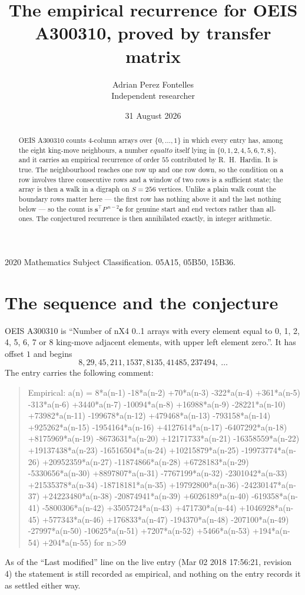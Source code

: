 \documentclass[11pt,a4paper]{article}
\title{The empirical recurrence for OEIS A300310, proved by transfer matrix}
\author{Adrian Perez Fontelles\\ \small Independent researcher}
\date{31 August 2026}
\theoremstyle{plain}
\theoremstyle{definition}
\begin{document}
\maketitle

\begin{abstract}
OEIS A300310 counts $4$-column arrays over $\{0,\dots,1\}$ in which every entry has,
among the eight king-move neighbours, a number $equal to$ itself lying in $\{0,1,2,4,5,6,7,8\}$, and it carries an empirical
recurrence of order $55$ contributed by R.~H.~Hardin. It is true. The neighbourhood
reaches one row up and one row down, so the condition on a row involves three consecutive
rows and a window of two rows is a sufficient state; the array is then a walk in a digraph
on $S=256$ vertices. Unlike a plain walk count the boundary rows matter here --- the first
row has nothing above it and the last nothing below --- so the count is
$\mathbf{s}^{\!\top}P^{\,n-2}\mathbf{e}$ for genuine start and end vectors rather than
all-ones. The conjectured recurrence is then annihilated exactly, in integer arithmetic.
\end{abstract}

\noindent\small 2020 Mathematics Subject Classification. 05A15, 05B50, 15B36.\normalsize

\section{The sequence and the conjecture}

OEIS A300310 is ``Number of nX4 0..1 arrays with every element equal to 0, 1, 2, 4, 5, 6, 7 or 8 king-move adjacent elements, with upper left element zero.''. It has offset
$1$ and begins
\[
8, 29, 45, 211, 1537, 8135, 41485, 237494,\ \dots
\]
The entry carries the following comment:
\begin{quote}\small
Empirical: a(n) = 8*a(n-1) -18*a(n-2) +70*a(n-3) -322*a(n-4) +361*a(n-5) -313*a(n-6) +3440*a(n-7) -10094*a(n-8) +16988*a(n-9) -28221*a(n-10) +73982*a(n-11) -199678*a(n-12) +479468*a(n-13) -793158*a(n-14) +925262*a(n-15) -1954164*a(n-16) +4127614*a(n-17) -6407292*a(n-18) +8175969*a(n-19) -8673631*a(n-20) +12171733*a(n-21) -16358559*a(n-22) +19137438*a(n-23) -16516504*a(n-24) +10215879*a(n-25) -19973774*a(n-26) +20952359*a(n-27) -11874866*a(n-28) +6728183*a(n-29) -5330656*a(n-30) +8897807*a(n-31) -7767199*a(n-32) -2301042*a(n-33) +21535378*a(n-34) -18718181*a(n-35) +19792800*a(n-36) -24230147*a(n-37) +24223480*a(n-38) -20874941*a(n-39) +6026189*a(n-40) -619358*a(n-41) -5800306*a(n-42) +3505724*a(n-43) +471730*a(n-44) +1046928*a(n-45) +577343*a(n-46) +176833*a(n-47) -194370*a(n-48) -207100*a(n-49) -27997*a(n-50) -10625*a(n-51) +7207*a(n-52) +5466*a(n-53) +194*a(n-54) +204*a(n-55) for n>59
\end{quote}
As of the ``Last modified'' line on the live entry (Mar 02 2018 17:56:21, revision
4) the statement is still recorded as empirical, and nothing on the entry
records it as settled either way.
\end{document}
